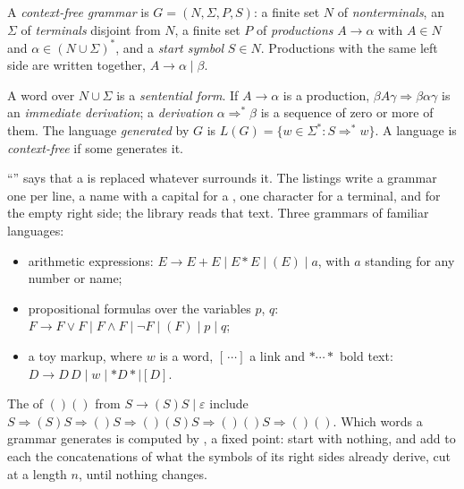 \begin{definition}\label{def:b2:context-free-languages:grammar}
A \emph{context-free grammar} is $G = (N, \Sigma, P, S)$: a finite set $N$ of
\emph{nonterminals}, an  $\Sigma$ of \emph{terminals} disjoint
from $N$, a finite set $P$ of \emph{productions} $A \to \alpha$ with $A \in N$ and $\alpha
\in (N \cup \Sigma)^*$, and a \emph{start symbol} $S \in N$. Productions with the same left side
are written together, $A \to \alpha \mid \beta$.
\end{definition}

\begin{definition}\label{def:b2:context-free-languages:derivation}
A word over $N \cup \Sigma$ is a \emph{sentential form}. If $A \to \alpha$ is a production, $\beta A \gamma \Rightarrow
\beta \alpha \gamma$ is an \emph{immediate derivation}; a \emph{derivation} $\alpha
\Rightarrow^* \beta$ is a sequence of zero or more of them. The language \emph{generated}
by $G$ is $L(G) = \{w \in \Sigma^* : S \Rightarrow^* w\}$. A language is
\emph{context-free} if some  generates it.
\end{definition}

``'' says that a  is replaced whatever surrounds it. The listings write a grammar one
 per line, a name with a capital for a , one character for a terminal, and  for the empty
right side; the library  reads that text. Three grammars of familiar languages:
\begin{itemize}
\item arithmetic expressions: $E \to E + E \mid E * E \mid (E) \mid a$, with $a$ standing for any number or name;
\item propositional formulas over the variables $p$, $q$: $F \to F \vee F \mid F \wedge F \mid \neg F \mid (F) \mid p
\mid q$;
\item a toy markup, where $w$ is a word, $[\,\cdots]$ a link and $*\cdots*$ bold text: $D \to D\,D \mid w \mid *D* \mid
[D]$.
\end{itemize}
The  of $()()$ from $S \to (S)S \mid \varepsilon$ include $S \Rightarrow (S)S \Rightarrow ()S \Rightarrow
()(S)S \Rightarrow ()()S \Rightarrow ()()$. Which words a grammar generates is computed by
, a fixed point: start with nothing, and add to each  the concatenations of what the
symbols of its right sides already derive, cut at a length $n$, until nothing changes.

